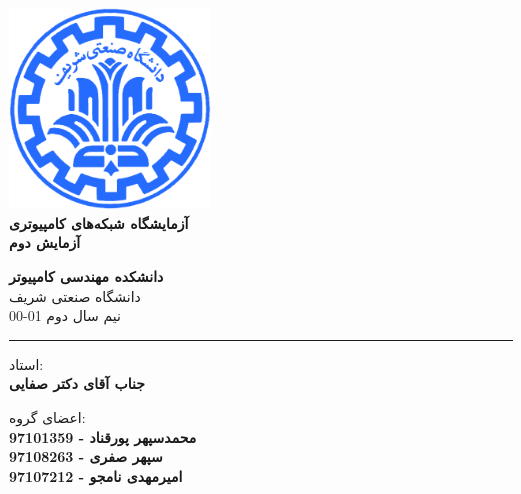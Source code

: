 \documentclass[12pt]{article}
\begin{document}
\begin{titlepage}
\begin{center}
        
\vspace*{0.7cm}

\includegraphics[width=0.4\textwidth]{sharif1.png}\\
\vspace{0.5cm}
\textbf{ \Huge{\emph ‌آزمایشگاه شبکه‌های کامپیوتری} }\\
\vspace{0.5cm}
\textbf{ \Large{ آزمایش دوم} }
\vspace{0.2cm}
       
 
      \large \textbf{دانشکده مهندسی کامپیوتر}\\\vspace{0.2cm}
    \large   دانشگاه صنعتی شریف\\\vspace{0.2cm}
       \large   ﻧﯿﻢ سال دوم 01-00 \\\vspace{0.2cm}
      \noindent\rule[1ex]{\linewidth}{1pt}
استاد:\\
    \textbf{{جناب آقای دکتر صفایی}}


    \vspace{0.15cm}
اعضای گروه:\\

    \textbf{{محمدسپهر پورقناد - 97101359}}
    \\
   
    \textbf{{سپهر صفری - 97108263}}       
   \\
   
    \textbf{{امیرمهدی نامجو - 97107212}}
\end{center}
\end{titlepage}


\newpage
\pagestyle{fancy}
\fancyhf{}
\fancyfoot{}
\cfoot{\thepage}
\chead{}
\end{document}

